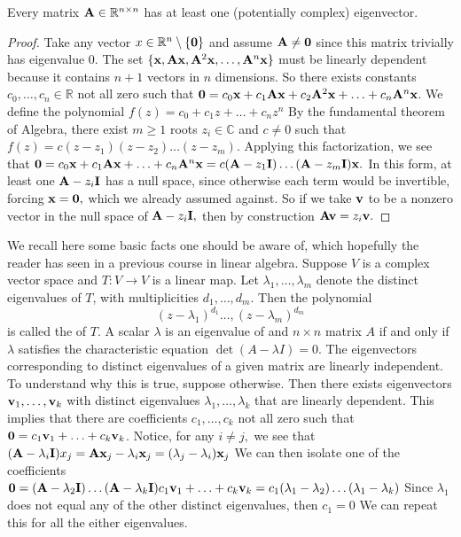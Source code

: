\begin{proposition}
Every matrix $\MA \in \mathbb R^{n \times n}$ has at least one (potentially complex) eigenvector. 
\end{proposition}
\begin{proof}
Take any vector $x \in \mathbb R^n \setminus \{ \vzero\} $ and assume $\MA \not = \vzero$ since this matrix trivially has eigenvalue 0. The set 
$\{\vx, \MA\vx, \MA^2 \vx, \ldots, \MA^n \vx\}$
must be linearly dependent because it contains $n + 1$ vectors in $n$ dimensions. So there exists constants $c_0, \ldots, c_n \in \mathbb R$ not all zero such that 
$\vzero = c_0 \vx + c_1 \MA\vx + c_2 \MA^2\vx + \ldots +c_n \MA^n \vx$.
We define the polynomial 
$f(z) = c_0 + c_1 z + \ldots + c_n z^n$
By the fundamental theorem of Algebra, there exist $m \geq 1$ roots $z_i \in \mathbb C$ and $c \not = 0$ such that 
$f(z) = c(z- z_1) (z - z_2) \ldots (z - z_m).$
Applying this factorization, we see that 
$
\vzero = c_0 \vx + c_1 \MA\vx  + \ldots +c_n \MA^n \vx =  c (\MA - z_1 \MI) \ldots (\MA - z_m  \MI) \vx.
$
In this form, at least one $\MA - z_i \MI$ has a null space, since otherwise each term would be invertible, forcing $\vx = \vzero,$ which we already assumed against. So if we take $\vv$ to be a nonzero vector in the null space of $\MA - z_i \MI,$ then by construction 
$\MA\vv = z_i \vv.$
\end{proof}


We recall here some basic facts one should be aware of, which hopefully the reader has seen in a previous course in linear algebra. Suppose $V$ is a complex vector space and $T:V\to V$ is a linear map. Let $\lambda_1, \ldots, \lambda_m$ denote the distinct eigenvalues of $T$, with multiplicities $d_1, \ldots, d_m$. Then the polynomial 
$$(z - \lambda_1)^{d_1} \ldots, (z - \lambda_m)^{d_m}$$
is called the  of $T$. 
A scalar $\lambda$ is an eigenvalue of and $n \times n$ matrix $A$ if and only if $\lambda$ satisfies the characteristic equation 
$\det(A - \lambda I) = 0$.
The eigenvectors corresponding to distinct eigenvalues of a given matrix are linearly independent.
To understand why this is true,
suppose otherwise. Then there exists eigenvectors $\vv_1, \ldots, \vv_k$ with distinct eigenvalues $\lambda_1, \ldots, \lambda_k$ that are linearly dependent. This implies that there are coefficients $c_1, \ldots, c_k$ not all zero such that 
$\vzero = c_1 \vv_1 + \ldots + c_k \vv_k$. 
Notice, for any $i \not = j,$ we see that 
$(\MA - \lambda_i \MI) x_j = \MA\vx_j - \lambda_i \vx_j = (\lambda_j - \lambda_i) \vx_j$
We can then isolate one of the coefficients 
$\vzero = (\MA - \lambda_2 \MI) \ldots (\MA - \lambda_k \MI)c_1 \vv_1 + \ldots + c_k \vv_k = c_1 (\lambda_1 - \lambda_2) \ldots (\lambda_1 - \lambda_k) $
Since $\lambda_1$ does not equal any of the other distinct eigenvalues, then 
$c_1 = 0$
We can repeat this for all the either eigenvalues. 


